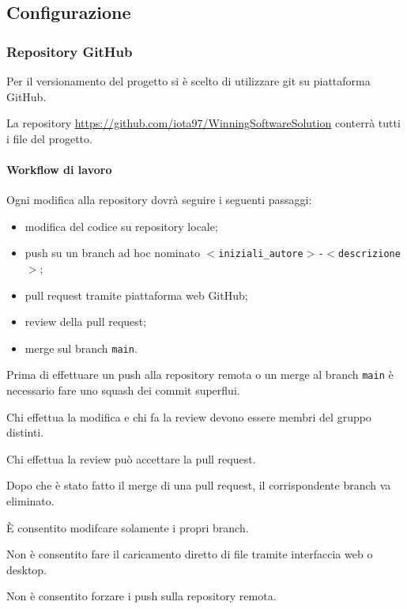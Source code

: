 \documentclass[a4paper, 12pt]{article}
\begin{document}
\subsection{Configurazione}

\subsubsection{Repository GitHub}\label{configurazione-github}
Per il versionamento del progetto si è scelto di utilizzare git su piattaforma GitHub.

La repository \url{https://github.com/iota97/WinningSoftwareSolution} conterrà tutti i file del progetto.

\paragraph{Workflow di lavoro}
Ogni modifica alla repository dovrà seguire i seguenti passaggi:
\begin{itemize}
\item modifica del codice su repository locale;
\item push su un branch ad hoc nominato \texttt{$<$iniziali\_autore$>$-$<$descrizione$>$};
\item pull request tramite piattaforma web GitHub;
\item review della pull request;
\item merge sul branch \texttt{main}.
\end{itemize}

Prima di effettuare un push alla repository remota o un merge al branch \texttt{main} è necessario fare uno squash dei commit superflui.

Chi effettua la modifica e chi fa la review devono essere membri del gruppo distinti.

Chi effettua la review può accettare la pull request.

Dopo che è stato fatto il merge di una pull request, il corrispondente branch va eliminato.

È consentito modifcare solamente i propri branch.

Non è consentito fare il caricamento diretto di file tramite interfaccia web o desktop.

Non è consentito forzare i push sulla repository remota.
\end{document}
